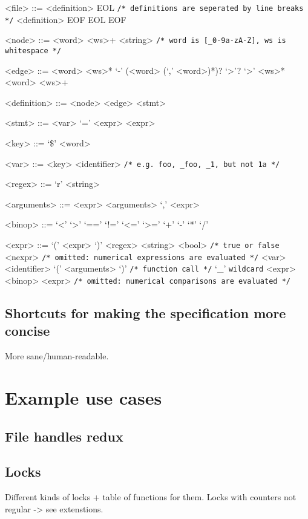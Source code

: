 \begin{grammar}

<file> ::= <definition> EOL \verb|/* definitions are seperated by line breaks */|
\alt <definition> EOF
\alt EOL
\alt EOF

<node> ::= <word> <ws>+ <string> \verb|/* word is [_0-9a-zA-Z], ws is whitespace */|

<edge> ::= <word> <ws>* `-' (<word> (`,' <word>)*)? `>'? `>' <ws>* <word> <ws>+

<definition> ::= <node>
\alt <edge> <stmt>

<stmt> ::= <var> `=' <expr>
\alt <expr>

<key> ::= `\$' <word>

<var> ::= <key>
\alt <identifier> \verb|/* e.g. foo, _foo, _1, but not 1a */|

<regex> ::= `r' <string>

<arguments> ::= <expr>
\alt <arguments> `,' <expr>

<binop> ::= `<' \alt `>' \alt `==' \alt `!=' \alt `<=' \alt `>=' \alt `+' \alt `-' \alt `*' \alt `/'

<expr> ::= `(' <expr> `)'
\alt <regex>
\alt <string>
\alt <bool> \verb|/* true or false|
\alt <nexpr> \verb|/* omitted: numerical expressions are evaluated */|
\alt <var>
\alt <identifier> `(' <arguments> `)' \verb|/* function call */|
\alt `_' \verb|wildcard|
\alt <expr> <binop> <expr> \verb|/* omitted: numerical comparisons are evaluated */|

\end{grammar}


\section{Shortcuts for making the specification more concise}
More sane/human-readable.


\chapter{Example use cases}

\section{File handles redux}

\section{Locks}
Different kinds of locks + table of functions for them.
Locks with counters not regular -> see extenstions.

